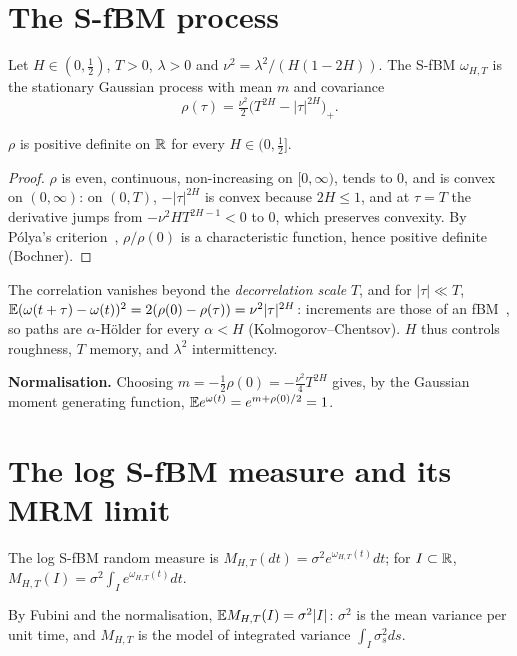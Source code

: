 \documentclass[10pt,twocolumn]{article}
\begin{document}
\section{The S-fBM process}
\begin{definition}
Let $H\in(0,\tfrac12)$, $T>0$, $\lambda>0$ and $\nu^2=\lambda^2/(H(1-2H))$. The S-fBM $\omega_{H,T}$ is the stationary Gaussian process with mean $m$ and covariance
\begin{equation}\label{eq:rho}
\rho(\tau)=\tfrac{\nu^2}{2}\big(T^{2H}-|\tau|^{2H}\big)_+ .
\end{equation}
\end{definition}
\begin{lemma}[admissibility]
$\rho$ is positive definite on $\mathbb{R}$ for every $H\in(0,\tfrac12]$.
\end{lemma}
\begin{proof}
$\rho$ is even, continuous, non-increasing on $[0,\infty)$, tends to $0$, and is convex on $(0,\infty)$: on $(0,T)$, $-|\tau|^{2H}$ is convex because $2H\le1$, and at $\tau=T$ the derivative jumps from $-\nu^2HT^{2H-1}<0$ to $0$, which preserves convexity. By P\'olya's criterion~\cite{polya1949}, $\rho/\rho(0)$ is a characteristic function, hence positive definite (Bochner).
\end{proof}
The correlation vanishes beyond the \emph{decorrelation scale} $T$, and for $|\tau|\ll T$,
$\mathbb{E}(\omega(t+\tau)-\omega(t))^2=2(\rho(0)-\rho(\tau))=\nu^2|\tau|^{2H}$: increments are those of an fBM~\cite{mandelbrot1968}, so paths are $\alpha$-H\"older for every $\alpha<H$ (Kolmogorov--Chentsov). $H$ thus controls roughness, $T$ memory, and $\lambda^2$ intermittency.

\textbf{Normalisation.} Choosing $m=-\tfrac12\rho(0)=-\tfrac{\nu^2}{4}T^{2H}$ gives, by the Gaussian moment generating function, $\mathbb{E} e^{\omega(t)}=e^{m+\rho(0)/2}=1$.

\section{The log S-fBM measure and its MRM limit}
\begin{definition}
The log S-fBM random measure is $M_{H,T}(dt)=\sigma^2e^{\omega_{H,T}(t)}dt$; for $I\subset\mathbb{R}$, $M_{H,T}(I)=\sigma^2\!\int_Ie^{\omega_{H,T}(t)}dt$.
\end{definition}
By Fubini and the normalisation, $\mathbb{E} M_{H,T}(I)=\sigma^2|I|$: $\sigma^2$ is the mean variance per unit time, and $M_{H,T}$ is the model of integrated variance $\int_I\sigma_s^2ds$.
\end{document}
